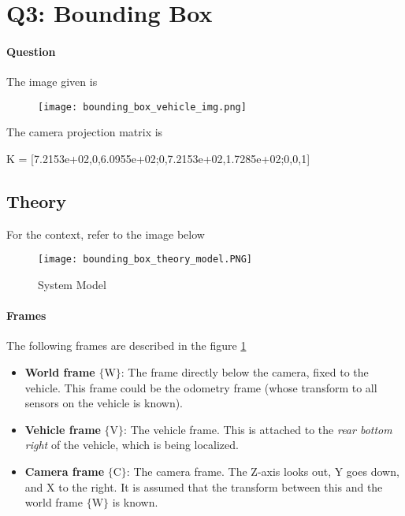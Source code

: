 
\section{Q3: Bounding Box}

\paragraph*{Question}
\begin{displayquote}
    
\end{displayquote}

The image given is

\begin{figure}[h]
    \centering
    \texttt{[image: bounding\_box\_vehicle\_img.png]}
\end{figure}

The camera projection matrix is

\begin{displayquote}
    K = [7.2153e+02,0,6.0955e+02;0,7.2153e+02,1.7285e+02;0,0,1]
\end{displayquote}

\subsection{Theory}

For the context, refer to the image below

\begin{figure}[h]
    \centering
    \texttt{[image: bounding\_box\_theory\_model.PNG]}
    \caption{System Model}
    \label{fig:q3-model}
\end{figure}

\paragraph*{Frames}
The following frames are described in the figure \ref{fig:q3-model}

\begin{itemize}
    \item \textbf{World frame} $\{\textrm{W}\}$: The frame directly below the camera, fixed to the vehicle. This frame could be the odometry frame (whose transform to all sensors on the vehicle is known).
    \item \textbf{Vehicle frame} $\{\textrm{V}\}$: The vehicle frame. This is attached to the \textit{rear bottom right} of the vehicle, which is being localized.
    \item \textbf{Camera frame} $\{\textrm{C}\}$: The camera frame. The Z-axis looks out, Y goes down, and X to the right. It is assumed that the transform between this and the world frame $\{\textrm{W}\}$ is known.
\end{itemize}

